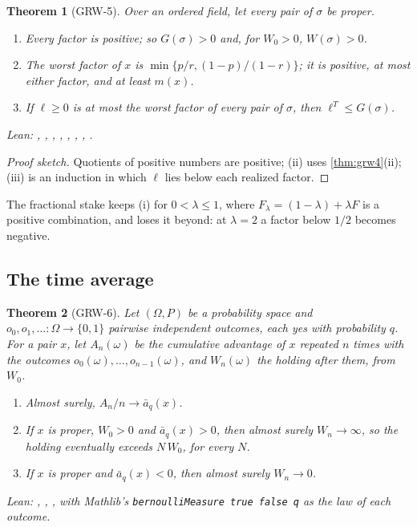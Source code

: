 \documentclass[11pt]{article}
\theoremstyle{plain}
\newtheorem{theorem}{Theorem}[section]
\theoremstyle{definition}
\theoremstyle{remark}
\newenvironment{leannames}{\par\smallskip\small\raggedright\upshape\noindent Lean: }{\par}
\newcommand{\abar}{\bar a}
\begin{document}
\begin{theorem}[GRW-5]
\label{thm:grw5}
Over an ordered field, let every pair of $\sigma$ be proper.
\begin{enumerate}
  \item[(i)] Every factor is positive; so $G(\sigma)>0$ and, for $W_0>0$, $W(\sigma)>0$.
  \item[(ii)] The worst factor of $x$ is $\min\{p/r,(1-p)/(1-r)\}$; it is positive, at most either
    factor, and at least $m(x)$.
  \item[(iii)] If $\ell\ge0$ is at most the worst factor of every pair of $\sigma$, then
    $\ell^T\le G(\sigma)$.
\end{enumerate}
\begin{leannames}
, , , ,
, , , .
\end{leannames}
\end{theorem}

\begin{proof}[Proof sketch]
Quotients of positive numbers are positive; (ii) uses \cref{thm:grw4}(ii); (iii) is an induction in
which $\ell$ lies below each realized factor.
\end{proof}

The fractional stake keeps (i) for $0<\lambda\le1$, where $F_\lambda=(1-\lambda)+\lambda F$ is a
positive combination, and loses it beyond: at $\lambda=2$ a factor below $1/2$ becomes negative.

\subsection{The time average}

\begin{theorem}[GRW-6]
\label{thm:grw6}
Let $(\Omega,P)$ be a probability space and $o_0,o_1,\ldots\colon\Omega\to\{0,1\}$ pairwise
independent outcomes, each yes with probability $q$. For a pair $x$, let $A_n(\omega)$ be the
cumulative advantage of $x$ repeated $n$ times with the outcomes
$o_0(\omega),\dots,o_{n-1}(\omega)$, and $W_n(\omega)$ the holding after them, from $W_0$.
\begin{enumerate}
  \item[(i)] Almost surely, $A_n/n\to\abar_q(x)$.
  \item[(ii)] If $x$ is proper, $W_0>0$ and $\abar_q(x)>0$, then almost surely $W_n\to\infty$, so
    the holding eventually exceeds $N\,W_0$, for every $N$.
  \item[(iii)] If $x$ is proper and $\abar_q(x)<0$, then almost surely $W_n\to0$.
\end{enumerate}
\begin{leannames}
, ,
, with Mathlib's \texttt{bernoulliMeasure true false q} as the law of
each outcome.
\end{leannames}
\end{theorem}
\end{document}
